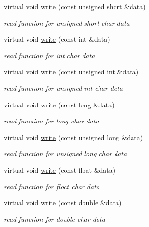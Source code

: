 \begin{DoxyCompactItemize}
virtual void \hyperlink{class_i_dream_sky_1_1_output_stream_aaaa0e1f1d4e06cab696fdd5b68a7e63c}{write} (const unsigned short \&data)
\begin{DoxyCompactList}\small\item\em read function for unsigned short char data \end{DoxyCompactList}\item 
virtual void \hyperlink{class_i_dream_sky_1_1_output_stream_a6ab73ae4cd180757f6ba3db92bad567f}{write} (const int \&data)
\begin{DoxyCompactList}\small\item\em read function for int char data \end{DoxyCompactList}\item 
virtual void \hyperlink{class_i_dream_sky_1_1_output_stream_a89b26b143d0b82f63f58377aaab2c114}{write} (const unsigned int \&data)
\begin{DoxyCompactList}\small\item\em read function for unsigned int char data \end{DoxyCompactList}\item 
virtual void \hyperlink{class_i_dream_sky_1_1_output_stream_ab284b427000c1a7194ce4b611869d8be}{write} (const long \&data)
\begin{DoxyCompactList}\small\item\em read function for long char data \end{DoxyCompactList}\item 
virtual void \hyperlink{class_i_dream_sky_1_1_output_stream_aa586f0b458bbbb573f9a70deafa1ccf9}{write} (const unsigned long \&data)
\begin{DoxyCompactList}\small\item\em read function for unsigned long char data \end{DoxyCompactList}\item 
virtual void \hyperlink{class_i_dream_sky_1_1_output_stream_af32427b66a2a97f456fbeac50ef6f054}{write} (const float \&data)
\begin{DoxyCompactList}\small\item\em read function for float char data \end{DoxyCompactList}\item 
virtual void \hyperlink{class_i_dream_sky_1_1_output_stream_a135990726070a396ae461bd8cba59cb8}{write} (const double \&data)
\begin{DoxyCompactList}\small\item\em read function for double char data \end{DoxyCompactList}\item 

\end{DoxyCompactItemize}

